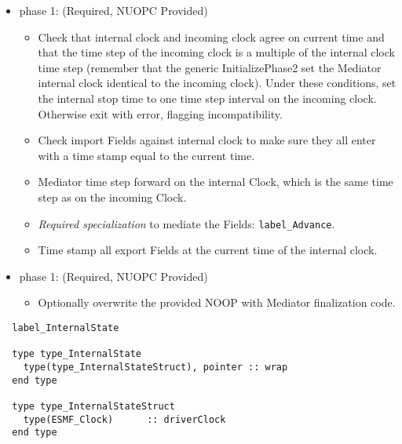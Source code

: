 \begin{itemize}
\item phase 1: ({\sc Required, NUOPC Provided})
  \begin{itemize}
  \item Check that internal clock and incoming clock agree on current time and that the time step of the incoming clock is a multiple of the internal clock time step (remember that the generic InitializePhase2 set the Mediator internal clock identical to the incoming clock). Under these conditions, set the internal stop time to one time step interval on the incoming clock. Otherwise exit with error, flagging incompatibility.
  \item Check import Fields against internal clock to make sure they all enter with a time stamp equal to the current time.
  \item Mediator time step forward on the internal Clock, which is the same time step as on the incoming Clock.
  \item {\it Required specialization} to mediate the Fields: {\tt label\_Advance}.
  \item Time stamp all export Fields at the current time of the internal clock.
  \end{itemize}    
\end{itemize}

\begin{itemize}
\item phase 1: ({\sc Required, NUOPC Provided})
  \begin{itemize}
  \item Optionally overwrite the provided NOOP with Mediator finalization code.
  \end{itemize}      
\end{itemize}

\begin{verbatim}  label_InternalState

  type type_InternalState
    type(type_InternalStateStruct), pointer :: wrap
  end type

  type type_InternalStateStruct
    type(ESMF_Clock)      :: driverClock
  end type

\end{verbatim}

